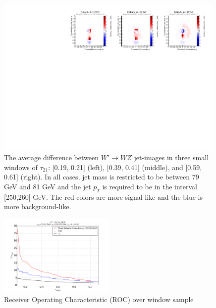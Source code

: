 \begin{figure}[bt]
  \begin{center}
  
        \includegraphics[width=0.99\textwidth]{figures/difference_fixed_nonorm.pdf}
        
      \caption{
         The average difference between $W'\rightarrow WZ$ jet-images in three small windows of $\tau_{21}$: [0.19, 0.21] (left), [0.39, 0.41] (middle), and [0.59, 0.61] (right).  In all cases, jet mass is restricted to be between 79 GeV and 81 GeV and the jet $p_T$ is required to be in the interval [250,260] GeV.  The red colors are more signal-like and the blue is more background-like.
        \label{fig:meanImagesWindow2} 
      }
    \end{center}
\end{figure}  

\begin{figure}[htbp]
  \centering
  \includegraphics[width=0.5\textwidth]{figures/augwindow-roc.pdf}
  \caption{Receiver Operating Characteristic (ROC) over window sample}
  \label{fig:rocWindow}
\end{figure}


